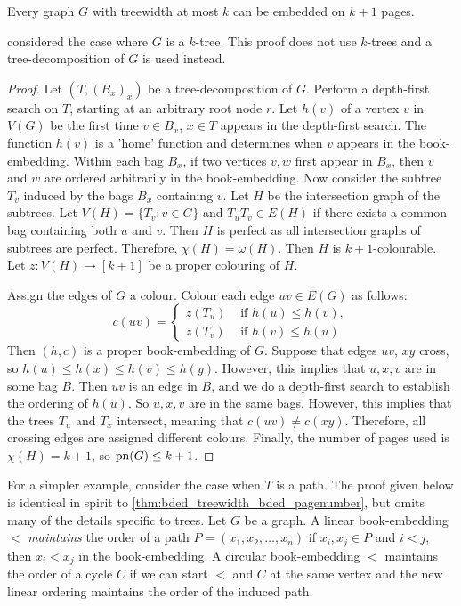\begin{theorem}\label{thm:bded_treewidth_bded_pagenumber}
	Every graph \(G\) with treewidth at most $k$ can be embedded on $k + 1$ pages.
\end{theorem}
\textcite{ganleyPagenumberTrees2001} considered the case where \(G\) is a \(k\)-tree. This proof does not use $k$-trees and a tree-decomposition of \(G\) is used instead. 

\begin{proof}
	Let  $(T, (B_x)_x)$ be a tree-decomposition of \(G\). Perform a depth-first search on \(T\), starting at an arbitrary root node \(r\). Let \(h(v)\) of a vertex \(v\) in \(V(G)\) be the first time \(v \in B_x\), $x \in T$ appears in the depth-first search. The function $h(v)$ is a 'home' function and determines when $v$ appears in the book-embedding. Within each bag $B_x$, if two vertices $v,w$ first appear in $B_x$, then $v$ and $w$ are ordered arbitrarily in the book-embedding. Now consider the subtree \(T_v\) induced by the bags \(B_x\) containing \(v\). Let \(H\) be the intersection graph of the subtrees. Let \(V(H) = \lbrace T_v : v \in G \rbrace\) and \(T_u T_v \in E(H)\) if there exists a common bag containing both $u$ and $v$. Then \(H\) is perfect as all intersection graphs of subtrees are perfect. Therefore, \(\chi(H) = \omega(H)\). Then \(H\) is \(k + 1\)-colourable. Let $z: V(H) \rightarrow [k + 1]$ be a proper colouring of $H$. 

	Assign the edges of \(G\) a colour. Colour each edge \(uv \in E(G)\) as follows:
	\begin{equation}
		c(uv) =
		\begin{cases}
			z(T_u) & \text{ if } h(u) \leq h(v), \\
			z(T_v) & \text{ if } h(v) \leq h(u)
		\end{cases}
	\end{equation}
	Then $(h, c)$ is a proper book-embedding of \(G\). Suppose that edges \(uv\), \(xy\) cross, so \(h(u) \leq h(x) \leq h(v) \leq h(y)\). However, this implies that $u,x,v$ are in some bag $B$. Then \(uv\) is an edge in \(B\), and we do a depth-first search to establish the ordering of $h(u)$. So \(u, x, v\) are in the same bags. However, this implies that the trees \(T_u\) and \(T_x\) intersect, meaning that \(c(uv) \neq c(xy)\). Therefore, all crossing edges are assigned different colours. Finally, the number of pages used is \(\chi(H) = k + 1\), so \(\operatorname{pn}(G) \leq k + 1\). 
\end{proof}
For a simpler example, consider the case when $T$ is a path. The proof given below is identical in spirit to \cref{thm:bded_treewidth_bded_pagenumber}, but omits many of the details specific to trees. 
Let $G$ be a graph. A linear book-embedding $<$ \textit{maintains} the order of a path $P = (x_1, x_2, \ldots, x_n)$ if $x_i, x_j \in P$ and $i < j$, then $x_i < x_j$ in the book-embedding. A circular book-embedding $<$ maintains the order of a cycle $C$ if we can start $<$ and $C$ at the same vertex and the new linear ordering maintains the order of the induced path. 

